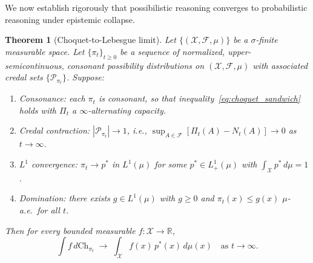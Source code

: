 \documentclass[12pt]{article}
\newtheorem{theorem}{Theorem}[section]
\newcommand{\calF}{\mathcal{F}}
\newcommand{\calX}{\mathcal{X}}
\newcommand{\R}{\mathbb{R}}
\newcommand{\Lone}{L^1}
\begin{document}
We now establish rigorously that possibilistic reasoning converges to probabilistic
reasoning under epistemic collapse.

\begin{theorem}[Choquet-to-Lebesgue limit]
\label{thm:choquet_lebesgue}
Let $\{(\calX,\calF,\mu)\}$ be a $\sigma$-finite measurable space.
Let $\{\pi_t\}_{t\ge 0}$ be a sequence of normalized, upper-semi\-continuous,
\emph{consonant} possibility distributions on $(\calX,\calF,\mu)$ with
associated credal sets $\{\mathcal{P}_{\pi_t}\}$.
Suppose:
\begin{enumerate}[label=\textup{(A\arabic*)},ref=A\arabic*]
\item\label{A1} \emph{Consonance}: each $\pi_t$ is consonant, so that
  inequality~\eqref{eq:choquet_sandwich} holds with $\Pi_t$ a
  $\infty$-alternating capacity.
\item\label{A2} \emph{Credal contraction}: $|\mathcal{P}_{\pi_t}|\to 1$,
  i.e., $\sup_{A\in\calF}[\Pi_t(A)-N_t(A)]\to 0$ as $t\to\infty$.
\item\label{A3} \emph{$L^1$ convergence}: $\pi_t\to p^*$ in $\Lone(\mu)$ for
  some $p^*\in\Lone_+(\mu)$ with $\int_\calX p^*\,d\mu=1$.
\item\label{A4} \emph{Domination}: there exists $g\in\Lone(\mu)$ with $g\ge 0$
  and $\pi_t(x)\le g(x)$ $\mu$-a.e.\ for all $t$.
\end{enumerate}
Then for every bounded measurable $f:\calX\to\R$,
\begin{equation}
\int f\,d\mathrm{Ch}_{\pi_t}
\;\longrightarrow\;
\int_\calX f(x)\,p^*(x)\,d\mu(x)
\quad\text{as }t\to\infty.
\label{eq:choquet_limit}
\end{equation}
\end{theorem}
\end{document}
